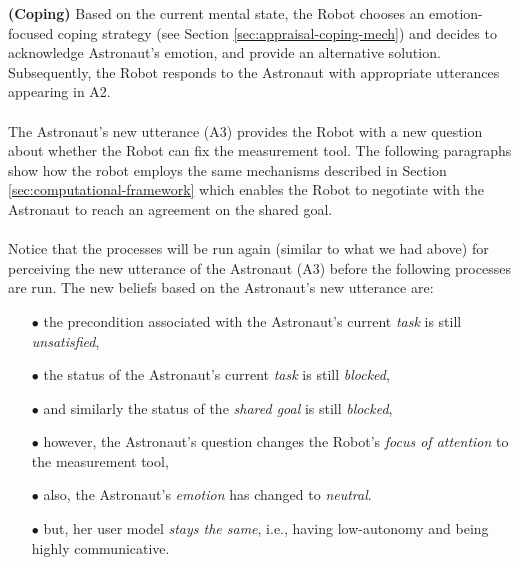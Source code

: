 \noindent \textbf{(Coping)} Based on the current mental state, the Robot chooses
an emotion-focused coping strategy (see Section \ref{sec:appraisal-coping-mech})
and decides to acknowledge Astronaut's emotion, and provide an alternative
solution. Subsequently, the Robot responds to the Astronaut with appropriate
utterances appearing in A2.\\

\noindent {}\\

The Astronaut's new utterance (A3) provides the Robot with a new question about
whether the Robot can fix the measurement tool. The following paragraphs show
how the robot employs the same mechanisms described in Section
\ref{sec:computational-framework} which enables the Robot to negotiate with the
Astronaut to reach an agreement on the shared goal.\\

\noindent{}\\

Notice that the processes will be run again (similar to what we had above) for
perceiving the new utterance of the Astronaut (A3) before the following
processes are run. The new beliefs based on the Astronaut's new utterance are:

\begin{itemize}
  \item[$\bullet$] the precondition associated with the Astronaut's current
  \textit{task} is still \textit{unsatisfied},
  \item[$\bullet$] the status of the Astronaut's current \textit{task} is still
  \textit{blocked},
  \item[$\bullet$] and similarly the status of the \textit{shared goal} is
  still \textit{blocked},
  \item[$\bullet$] however, the Astronaut's question changes the Robot's
  \textit{focus of attention} to the measurement tool,
  \item[$\bullet$] also, the Astronaut's \textit{emotion} has changed to
  \textit{neutral}.
  \item[$\bullet$] but, her user model \textit{stays the same}, i.e.,
  having low-autonomy and being highly communicative.
\end{itemize}

